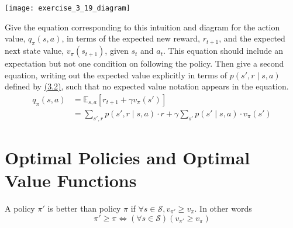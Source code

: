 \begin{exercise}{3.19}
    \begin{center}
        \texttt{[image: exercise\_3\_19\_diagram]}
    \end{center}
    Give the equation corresponding to this intuition and diagram for the action value,
    $q_{\pi}(s,a)$, in terms of the expected new reward, $r_{t+1}$, and the expected
    next state value, $v_{\pi}(s_{t+1})$, given $s_t$ and $a_t$.
    This equation should include an expectation but not one condition on following the policy.
    Then give a second equation, writing out the expected value explicitly in terms of
    $p(s',r\mid s,a)$ defined by \hyperref[eq:3.2]{(3.2)}, such that no expected value notation
    appears in the equation.
    \[
        \begin{aligned}
            q_{\pi}(s,a)&=\mathbb{E}_{s,a}\left[r_{t+1}+\gamma v_{\pi}(s')\right]\\
            &=\sum_{s',r}p(s',r\mid s,a)\cdot r + \gamma\sum_{s'}p(s'\mid s,a)\cdot v_{\pi}(s')
        \end{aligned}
    \]
\end{exercise}

\section{Optimal Policies and Optimal Value Functions}
A policy $\pi'$ is better than policy $\pi$ if $\forall s \in \mathcal{S}, v_{\pi'}\geq v_{\pi}$.
In other words
\[
    \pi'\geq \pi \Longleftrightarrow (\forall s\in\mathcal{S})(v_{\pi'}\geq v_{\pi})
\]

